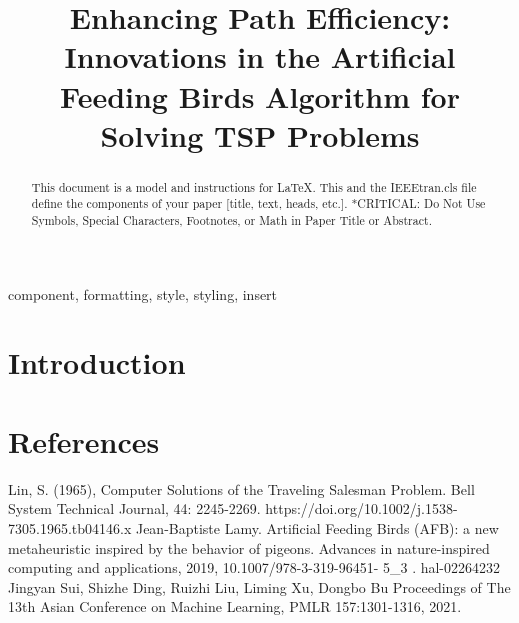 \documentclass[conference]{IEEEtran}
\begin{document}
\title{Enhancing Path Efficiency: Innovations in the Artificial Feeding Birds Algorithm for Solving TSP Problems\\
}

\author{
\and
{}
}

\maketitle

\begin{abstract}
This document is a model and instructions for \LaTeX.
This and the IEEEtran.cls file define the components of your paper [title, text, heads, etc.]. *CRITICAL: Do Not Use Symbols, Special Characters, Footnotes, 
or Math in Paper Title or Abstract.
\end{abstract}

\begin{IEEEkeywords}
component, formatting, style, styling, insert
\end{IEEEkeywords}

\section{Introduction}








\section*{References}

\begin{thebibliography}{00}
 Lin, S. (1965), Computer Solutions of the Traveling Salesman Problem. Bell System Technical Journal, 44: 2245-2269. https://doi.org/10.1002/j.1538-7305.1965.tb04146.x
 Jean-Baptiste Lamy. Artificial Feeding Birds (AFB): a new metaheuristic inspired by the behavior of pigeons. Advances in nature-inspired computing and applications, 2019, 10.1007/978-3-319-96451- 5\_3 . hal-02264232
 Jingyan Sui, Shizhe Ding, Ruizhi Liu, Liming Xu, Dongbo Bu Proceedings of The 13th Asian Conference on Machine Learning, PMLR 157:1301-1316, 2021.

\end{thebibliography}
\vspace{12pt}
\end{document}
